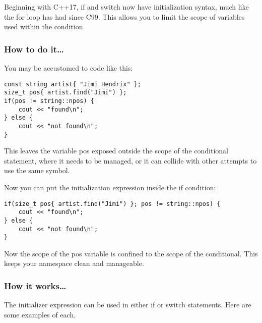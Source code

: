 
Beginning with C++17, if and switch now have initialization syntax, much like the for loop has had since C99. This allows you to limit the scope of variables used within the condition.

\subsubsection{How to do it…}

You may be accustomed to code like this:

\begin{lstlisting}[style=styleCXX]
const string artist{ "Jimi Hendrix" };
size_t pos{ artist.find("Jimi") };
if(pos != string::npos) {
	cout << "found\n";
} else {
	cout << "not found\n";
}
\end{lstlisting}

This leaves the variable pos exposed outside the scope of the conditional statement, where it needs to be managed, or it can collide with other attempts to use the same symbol.

Now you can put the initialization expression inside the if condition:

\begin{lstlisting}[style=styleCXX]
if(size_t pos{ artist.find("Jimi") }; pos != string::npos) {
	cout << "found\n";
} else {
	cout << "not found\n";
}
\end{lstlisting}

Now the scope of the pos variable is confined to the scope of the conditional. This keeps your namespace clean and manageable.

\subsubsection{How it works…}

The initializer expression can be used in either if or switch statements. Here are some examples of each.

